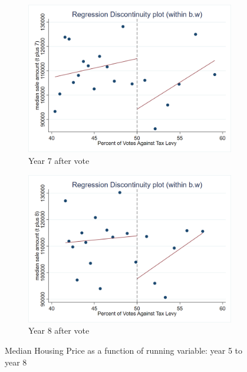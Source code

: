 \begin{figure}[ht]
    \vspace{1em}

    \begin{minipage}[b]{0.48\textwidth}
        \centering
        \begin{subfigure}[b]{\textwidth}
            \centering
            \includegraphics[width=\textwidth,keepaspectratio]{images/rd_plot_median_sale_amount_t_plus_7_tri_mserd_1_2_within.png}
            \caption{Year 7 after vote}
            \label{fig:hp_year7_after}
        \end{subfigure}
    \end{minipage}
    \hfill
    \begin{minipage}[b]{0.48\textwidth}
        \centering
        \begin{subfigure}[b]{\textwidth}
            \centering
            \includegraphics[width=\textwidth,keepaspectratio]{images/rd_plot_median_sale_amount_t_plus_8_tri_mserd_1_2_within.png}
            \caption{Year 8 after vote}
            \label{fig:hp_year8_after}
        \end{subfigure}
    \end{minipage}        

    \caption{Median Housing Price as a function of running variable: year 5 to year 8}
    \label{fig:rd_hp_2}
\end{figure}


